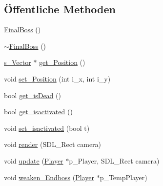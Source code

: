\subsection*{Öffentliche Methoden}
\begin{DoxyCompactItemize}
\item 
\hyperlink{class_final_boss_a8c9af880c40bda93a29718d19bf5575d}{Final\-Boss} ()
\item 
\hyperlink{class_final_boss_a94c592906185ab51d36fc28a235a5a76}{$\sim$\-Final\-Boss} ()
\item 
\hyperlink{structs___vector}{s\-\_\-\-Vector} $\ast$ \hyperlink{class_final_boss_a6c30600b7492a40d2ec99874d41296b0}{get\-\_\-\-Position} ()
\item 
void \hyperlink{class_final_boss_a65029b764ec03a87caf71e7687d23306}{set\-\_\-\-Position} (int i\-\_\-x, int i\-\_\-y)
\item 
bool \hyperlink{class_final_boss_abacad04a4ff64dd94b3338b7cab122f2}{get\-\_\-is\-Dead} ()
\item 
bool \hyperlink{class_final_boss_aa0baaf57ed8bacb2174fbcc65b75cec9}{get\-\_\-isactivated} ()
\item 
void \hyperlink{class_final_boss_aa9ee8f4ddea7ecfc2d7b9bbaf6ca73a6}{set\-\_\-isactivated} (bool t)
\item 
void \hyperlink{class_final_boss_a0dfe88f2e430bd3a8760801809ab7c01}{render} (S\-D\-L\-\_\-\-Rect camera)
\item 
void \hyperlink{class_final_boss_a201e58c54ae09fbfd97bf6ef4fb2843f}{update} (\hyperlink{class_player}{Player} $\ast$p\-\_\-\-Player, S\-D\-L\-\_\-\-Rect camera)
\item 
void \hyperlink{class_final_boss_a1579fd9da81da66bbed75799f7113be9}{weaken\-\_\-\-Endboss} (\hyperlink{class_player}{Player} $\ast$p\-\_\-\-Temp\-Player)
\end{DoxyCompactItemize}


